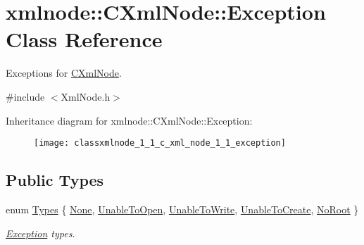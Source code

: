 \hypertarget{classxmlnode_1_1_c_xml_node_1_1_exception}{}\section{xmlnode\+::C\+Xml\+Node\+::Exception Class Reference}
\label{classxmlnode_1_1_c_xml_node_1_1_exception}


Exceptions for \mbox{\hyperlink{classxmlnode_1_1_c_xml_node}{C\+Xml\+Node}}.  




{\ttfamily \#include $<$Xml\+Node.\+h$>$}

Inheritance diagram for xmlnode\+::C\+Xml\+Node\+::Exception\+:\begin{figure}[H]
\begin{center}
\leavevmode
\texttt{[image: classxmlnode\_1\_1\_c\_xml\_node\_1\_1\_exception]}
\end{center}
\end{figure}
\subsection*{Public Types}
\begin{DoxyCompactItemize}
\item 
enum \mbox{\hyperlink{classxmlnode_1_1_c_xml_node_1_1_exception_abdbe07531ef4b19192f1fa2f819ed75f}{Types}} \{ \newline
\mbox{\hyperlink{classxmlnode_1_1_c_xml_node_1_1_exception_abdbe07531ef4b19192f1fa2f819ed75fa22036006e7862ed7f6fc42091f6a3bc8}{None}}, 
\mbox{\hyperlink{classxmlnode_1_1_c_xml_node_1_1_exception_abdbe07531ef4b19192f1fa2f819ed75fa725fdfe67e4fbd5539133a341a5e0a6e}{Unable\+To\+Open}}, 
\mbox{\hyperlink{classxmlnode_1_1_c_xml_node_1_1_exception_abdbe07531ef4b19192f1fa2f819ed75fab4da3fb6cf56910a8302ddb34b697295}{Unable\+To\+Write}}, 
\mbox{\hyperlink{classxmlnode_1_1_c_xml_node_1_1_exception_abdbe07531ef4b19192f1fa2f819ed75fa34828bed7772bc0588f97192c03ea4ad}{Unable\+To\+Create}}, 
\newline
\mbox{\hyperlink{classxmlnode_1_1_c_xml_node_1_1_exception_abdbe07531ef4b19192f1fa2f819ed75fa5e03a8ddc6c8873e07c6a34dc1d7a0e0}{No\+Root}}
 \}
\begin{DoxyCompactList}\small\item\em \mbox{\hyperlink{classxmlnode_1_1_c_xml_node_1_1_exception}{Exception}} types. \end{DoxyCompactList}\end{DoxyCompactItemize}
